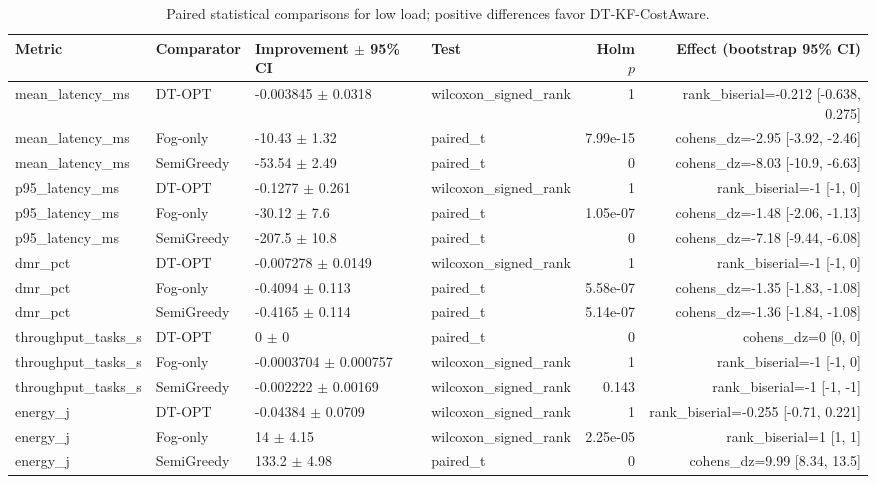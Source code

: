 \begin{table}[t]
\centering
\caption{Paired statistical comparisons for low load; positive differences favor DT-KF-CostAware.}
\label{tab:independent_paired_low}
\scriptsize
\begin{tabular}{llllrr}
\toprule
Metric & Comparator & Improvement $\pm$ 95\% CI & Test & Holm $p$ & Effect (bootstrap 95\% CI) \\
\midrule
mean\_latency\_ms & DT-OPT & -0.003845 $\pm$ 0.0318 & wilcoxon\_signed\_rank & 1 & rank\_biserial=-0.212 [-0.638, 0.275] \\
mean\_latency\_ms & Fog-only & -10.43 $\pm$ 1.32 & paired\_t & 7.99e-15 & cohens\_dz=-2.95 [-3.92, -2.46] \\
mean\_latency\_ms & SemiGreedy & -53.54 $\pm$ 2.49 & paired\_t & 0 & cohens\_dz=-8.03 [-10.9, -6.63] \\
p95\_latency\_ms & DT-OPT & -0.1277 $\pm$ 0.261 & wilcoxon\_signed\_rank & 1 & rank\_biserial=-1 [-1, 0] \\
p95\_latency\_ms & Fog-only & -30.12 $\pm$ 7.6 & paired\_t & 1.05e-07 & cohens\_dz=-1.48 [-2.06, -1.13] \\
p95\_latency\_ms & SemiGreedy & -207.5 $\pm$ 10.8 & paired\_t & 0 & cohens\_dz=-7.18 [-9.44, -6.08] \\
dmr\_pct & DT-OPT & -0.007278 $\pm$ 0.0149 & wilcoxon\_signed\_rank & 1 & rank\_biserial=-1 [-1, 0] \\
dmr\_pct & Fog-only & -0.4094 $\pm$ 0.113 & paired\_t & 5.58e-07 & cohens\_dz=-1.35 [-1.83, -1.08] \\
dmr\_pct & SemiGreedy & -0.4165 $\pm$ 0.114 & paired\_t & 5.14e-07 & cohens\_dz=-1.36 [-1.84, -1.08] \\
throughput\_tasks\_s & DT-OPT & 0 $\pm$ 0 & paired\_t & 0 & cohens\_dz=0 [0, 0] \\
throughput\_tasks\_s & Fog-only & -0.0003704 $\pm$ 0.000757 & wilcoxon\_signed\_rank & 1 & rank\_biserial=-1 [-1, 0] \\
throughput\_tasks\_s & SemiGreedy & -0.002222 $\pm$ 0.00169 & wilcoxon\_signed\_rank & 0.143 & rank\_biserial=-1 [-1, -1] \\
energy\_j & DT-OPT & -0.04384 $\pm$ 0.0709 & wilcoxon\_signed\_rank & 1 & rank\_biserial=-0.255 [-0.71, 0.221] \\
energy\_j & Fog-only & 14 $\pm$ 4.15 & wilcoxon\_signed\_rank & 2.25e-05 & rank\_biserial=1 [1, 1] \\
energy\_j & SemiGreedy & 133.2 $\pm$ 4.98 & paired\_t & 0 & cohens\_dz=9.99 [8.34, 13.5] \\

\end{tabular}
\end{table}
